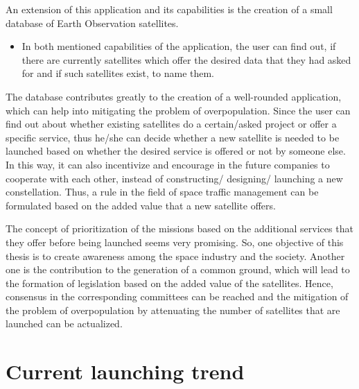 An extension of this application and its capabilities is the creation of a small database of Earth Observation satellites.

\begin{itemize}
\item In both mentioned capabilities of the application, the user can find out, if there are currently satellites which offer the desired data that they had asked for and if such satellites exist, to name them.
\end{itemize}

The database contributes greatly to the creation of a well-rounded application, which can help into mitigating the problem of overpopulation. Since the user can find out about whether existing satellites do a certain/asked project or offer a specific service, thus he/she can decide whether a new satellite is needed to be launched based on whether the desired service is offered or not by someone else. In this way, it can also incentivize and encourage in the future companies to cooperate with each other, instead of constructing/ designing/ launching a new constellation. Thus, a rule in the field of space traffic management can be formulated based on the added value that a new satellite offers.

The concept of prioritization of the missions based on the additional services that they offer before being launched seems very promising. So, one objective of this thesis is to create awareness among the space industry and the society. Another one is the contribution to the generation of a common ground, which will lead to the formation of legislation based on the added value of the satellites. Hence, consensus in the corresponding committees can be reached and the mitigation of the problem of overpopulation by attenuating the number of satellites that are launched can be actualized.





\bigskip
\section{Current launching trend}
\bigskip

